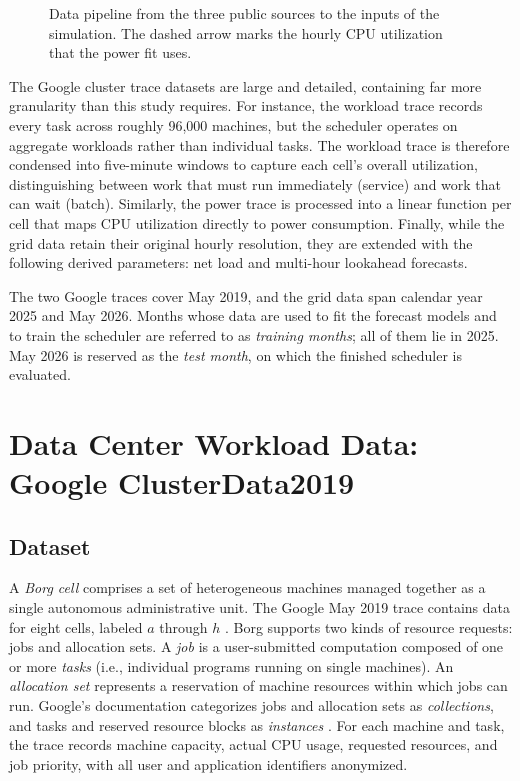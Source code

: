 \documentclass{UNCC-thesis}
\begin{document}
\begin{figure}[tbp]
  \caption[Data pipeline from the three public sources]{Data pipeline from the three public sources to the inputs of the
  simulation. The dashed arrow marks the hourly CPU utilization that the power
  fit uses.}
  \label{fig:data-pipeline}
\end{figure}

The Google cluster trace datasets are large and detailed, containing far more
granularity than this study requires. For instance, the workload trace records
every task across roughly 96,000 machines, but the scheduler operates on
aggregate workloads rather than individual tasks. The workload trace is
therefore condensed into five-minute windows to capture each cell's overall
utilization, distinguishing between work that must run immediately (service)
and work that can wait (batch). Similarly, the power trace is processed into a
linear function per cell that maps CPU utilization directly to power
consumption. Finally, while the grid data retain their original hourly resolution, they
are extended with the following derived parameters: net load and multi-hour lookahead
forecasts.

The two Google traces cover May 2019, and the grid data span calendar year
2025 and May 2026. Months whose data are used to fit the forecast models and to train the
scheduler are referred to as \emph{training months}; all of them lie in 2025. May 2026 is
reserved as the \emph{test month}, on which the finished scheduler is evaluated.

\section{Data Center Workload Data: Google ClusterData2019}
\label{sec:clusterdata2019}

\subsection{Dataset}
\label{subsec:clusterdata-role}

A \emph{Borg cell} comprises a set of heterogeneous machines managed together as a
single autonomous administrative unit. The Google May 2019 trace contains data
for eight cells, labeled \(a\) through \(h\)
\cite{wilkes2020clusterdata2019, tirmazi2020borg}. Borg supports two kinds of
resource requests: jobs and allocation sets. A \emph{job} is a
user-submitted computation composed of one or more \emph{tasks} (i.e.,
individual programs running on single machines). An \emph{allocation set} represents a
reservation of machine resources within which jobs can run. Google's
documentation categorizes jobs and allocation sets as \emph{collections}, and
tasks and reserved resource blocks as \emph{instances}
\cite{wilkes2020clusterdata2019}. For each machine and task, the trace records
machine capacity, actual CPU usage, requested resources, and job
priority, with all user and application identifiers anonymized.
\end{document}
